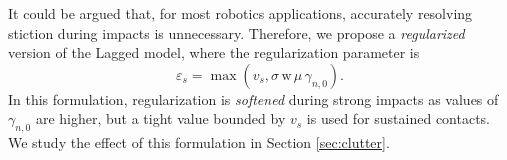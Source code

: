 It could be argued that, for most robotics applications,
accurately resolving stiction during impacts is unnecessary. Therefore, we
propose a \emph{regularized} version of the Lagged model, where the
regularization parameter is
\begin{equation}
    \varepsilon_s = \max(v_s, \sigma\,\text{w}\,\mu\,\gamma_{n, 0}).
    \label{eq:regularized_vs}
\end{equation}
In this formulation, regularization is \emph{softened} during strong impacts as
values of $\gamma_{n, 0}$ are higher, but a tight value bounded by $v_s$ is used
for sustained contacts. We study the effect of this formulation in Section
\ref{sec:clutter}.
